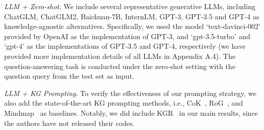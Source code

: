 \documentclass{article}
\theoremstyle{boldremark}
\begin{document}
\noindent \textit{LLM + Zero-shot}.
We include several representative generative LLMs, including ChatGLM, ChatGLM2, Baichuan-7B, InternLM, GPT-3, GPT-3.5 and GPT-4 as knowledge-agnostic alternatives. Specifically, we used the model ‘text-davinci-002’ provided by OpenAI as the implementation of GPT-3, and ‘gpt-3.5-turbo’ and ‘gpt-4’ as the implementations of GPT-3.5 and GPT-4, respectively (we have provided more implementation details of all LLMs in Appendix A.4). The question-answering task is conducted under the zero-shot setting with the question query from the test set as input.

\noindent \textit{LLM + KG Prompting}. To verify the effectiveness of our prompting strategy, we also add the state-of-the-art KG prompting methods, i.e., CoK~\cite{wang2023boosting}, RoG~\cite{luo2023reasoning}, and Mindmap~\cite{wen2023mindmap} as baselines.  Notably, we did include KGR~\cite{guan2024mitigating} in our main results, since the authors have not released their codes.
\end{document}
